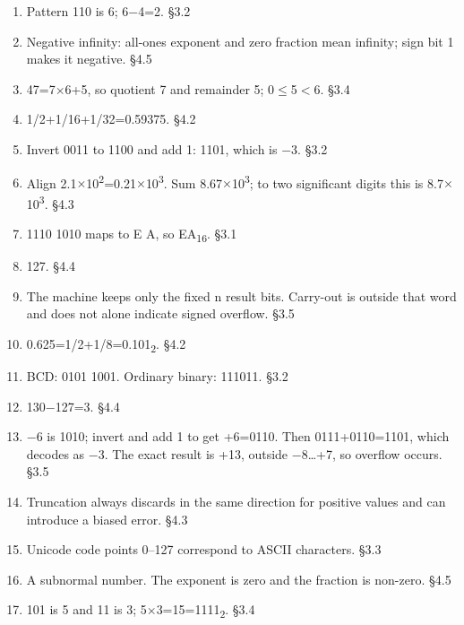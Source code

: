 \documentclass[11pt]{article}
\begin{document}
\begin{keepsection}
\begin{enumerate}
\item Pattern 110 is 6; 6\ensuremath{-}4=2. \hfill{\small\color{FAUblue}§3.2}
\item Negative infinity: all-ones exponent and zero fraction mean infinity; sign bit 1 makes it negative. \hfill{\small\color{FAUblue}§4.5}
\item 47=7\ensuremath{\times}6+5, so quotient 7 and remainder 5; 0\ensuremath{\leq}5\ensuremath{<}6. \hfill{\small\color{FAUblue}§3.4}
\item 1/2+1/16+1/32=0.59375. \hfill{\small\color{FAUblue}§4.2}
\item Invert 0011 to 1100 and add 1: 1101, which is \ensuremath{-}3. \hfill{\small\color{FAUblue}§3.2}
\item Align 2.1\ensuremath{\times}10\textsuperscript{2}=0.21\ensuremath{\times}10\textsuperscript{3}. Sum 8.67\ensuremath{\times}10\textsuperscript{3}; to two significant digits this is 8.7\ensuremath{\times}10\textsuperscript{3}. \hfill{\small\color{FAUblue}§4.3}
\item 1110 1010 maps to E A, so EA\textsubscript{16}. \hfill{\small\color{FAUblue}§3.1}
\item 127. \hfill{\small\color{FAUblue}§4.4}
\item The machine keeps only the fixed n result bits. Carry-out is outside that word and does not alone indicate signed overflow. \hfill{\small\color{FAUblue}§3.5}
\item 0.625=1/2+1/8=0.101\textsubscript{2}. \hfill{\small\color{FAUblue}§4.2}
\item BCD: 0101 1001. Ordinary binary: 111011. \hfill{\small\color{FAUblue}§3.2}
\item 130\ensuremath{-}127=3. \hfill{\small\color{FAUblue}§4.4}
\item \ensuremath{-}6 is 1010; invert and add 1 to get +6=0110. Then 0111+0110=1101, which decodes as \ensuremath{-}3. The exact result is +13, outside \ensuremath{-}8…+7, so overflow occurs. \hfill{\small\color{FAUblue}§3.5}
\item Truncation always discards in the same direction for positive values and can introduce a biased error. \hfill{\small\color{FAUblue}§4.3}
\item Unicode code points 0–127 correspond to ASCII characters. \hfill{\small\color{FAUblue}§3.3}
\item A subnormal number. The exponent is zero and the fraction is non-zero. \hfill{\small\color{FAUblue}§4.5}
\item 101 is 5 and 11 is 3; 5\ensuremath{\times}3=15=1111\textsubscript{2}. \hfill{\small\color{FAUblue}§3.4}

\end{enumerate}
\end{keepsection}
\end{document}
